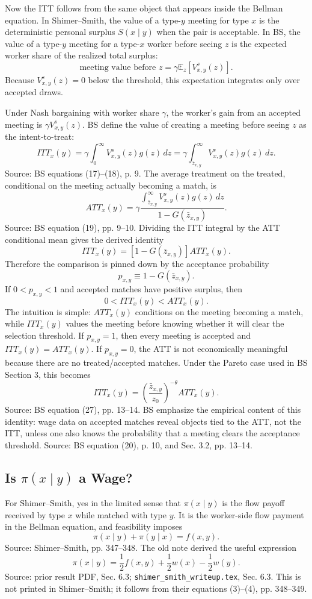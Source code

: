 ﻿\documentclass[11pt]{article}
\newcommand{\E}{\mathbb{E}}
\newcommand{\1}{\mathbf{1}}
\begin{document}
Now the ITT follows from the same object that appears inside the Bellman
equation. In Shimer--Smith, the value of a type-$y$ meeting for type $x$ is the
deterministic personal surplus $S(x\mid y)$ when the pair is acceptable. In BS,
the value of a type-$y$ meeting for a type-$x$ worker before seeing $z$ is the
expected worker share of the realized total surplus:
\[
\text{meeting value before }z
=
\gamma \E_z\!\left[V^s_{x,y}(z)\right].
\]
Because $V^s_{x,y}(z)=0$ below the threshold, this expectation integrates only
over accepted draws.

Under Nash bargaining with worker share $\gamma$, the worker's gain from an
accepted meeting is $\gamma V^s_{x,y}(z)$. BS define the value of creating a
meeting before seeing $z$ as the intent-to-treat:
\[
ITT_x(y)
=
\gamma\int_0^\infty V^s_{x,y}(z)g(z)\,dz
=
\gamma\int_{\bar z_{x,y}}^\infty V^s_{x,y}(z)g(z)\,dz.
\]
Source: BS equations (17)--(18), p. 9. The average treatment on the treated,
conditional on the meeting actually becoming a match, is
\[
ATT_x(y)
=
\gamma
\frac{\int_{\bar z_{x,y}}^\infty V^s_{x,y}(z)g(z)\,dz}
{1-G(\bar z_{x,y})}.
\]
Source: BS equation (19), pp. 9--10. Dividing the ITT integral by the ATT
conditional mean gives the derived identity
\[
ITT_x(y)=\left[1-G(\bar z_{x,y})\right]ATT_x(y).
\]
Therefore the comparison is pinned down by the acceptance probability
\[
p_{x,y}\equiv 1-G(\bar z_{x,y}).
\]
If $0<p_{x,y}<1$ and accepted matches have positive surplus, then
\[
0<ITT_x(y)<ATT_x(y).
\]
The intuition is simple: $ATT_x(y)$ conditions on the meeting becoming a match,
while $ITT_x(y)$ values the meeting before knowing whether it will clear the
selection threshold. If $p_{x,y}=1$, then every meeting is accepted and
$ITT_x(y)=ATT_x(y)$. If $p_{x,y}=0$, the ATT is not economically meaningful
because there are no treated/accepted matches.
Under the Pareto case used in BS Section 3, this becomes
\[
ITT_x(y)
=
\left(\frac{\bar z_{x,y}}{z_0}\right)^{-\theta}ATT_x(y).
\]
Source: BS equation (27), pp. 13--14. BS emphasize the empirical content of this
identity: wage data on accepted matches reveal objects tied to the ATT, not the
ITT, unless one also knows the probability that a meeting clears the acceptance
threshold. Source: BS equation (20), p. 10, and Sec. 3.2, pp. 13--14.

\subsection{Is $\pi(x\mid y)$ a Wage?}

For Shimer--Smith, yes in the limited sense that $\pi(x\mid y)$ is the flow payoff
received by type $x$ while matched with type $y$. It is the worker-side flow
payment in the Bellman equation, and feasibility imposes
\[
\pi(x\mid y)+\pi(y\mid x)=f(x,y).
\]
Source: Shimer--Smith, pp. 347--348. The old note derived the useful expression
\[
\pi(x\mid y)
=
\frac12 f(x,y)+\frac12 w(x)-\frac12 w(y).
\tag{SS-payoff}
\]
Source: prior result PDF, Sec. 6.3; \texttt{shimer\_smith\_writeup.tex},
Sec. 6.3. This is not printed in Shimer--Smith; it follows from their equations
(3)--(4), pp. 348--349.
\end{document}
